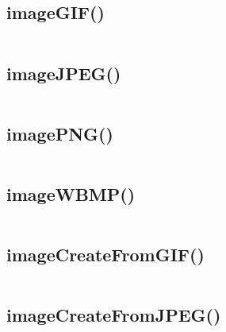 \subsection{imageGIF()}






\begin{lstlisting}[language=PHP]

\end{lstlisting}


\subsection{imageJPEG()}


\begin{lstlisting}[language=PHP]

\end{lstlisting}

\subsection{imagePNG()}


\begin{lstlisting}[language=PHP]

\end{lstlisting}

\subsection{imageWBMP()}


\begin{lstlisting}[language=PHP]

\end{lstlisting}




\subsection{imageCreateFromGIF()}





\begin{lstlisting}[language=PHP]

\end{lstlisting}


\subsection{imageCreateFromJPEG()}



